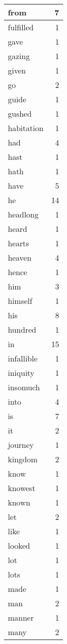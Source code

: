 \begin{center}
\begin{longtable}{l|r}
from & 7 \\ \hline
fulfilled & 1 \\ \hline
gave & 1 \\ \hline
gazing & 1 \\ \hline
given & 1 \\ \hline
go & 2 \\ \hline
guide & 1 \\ \hline
gushed & 1 \\ \hline
habitation & 1 \\ \hline
had & 4 \\ \hline
hast & 1 \\ \hline
hath & 1 \\ \hline
have & 5 \\ \hline
he & 14 \\ \hline
headlong & 1 \\ \hline
heard & 1 \\ \hline
hearts & 1 \\ \hline
heaven & 4 \\ \hline
hence & 1 \\ \hline
him & 3 \\ \hline
himself & 1 \\ \hline
his & 8 \\ \hline
hundred & 1 \\ \hline
in & 15 \\ \hline
infallible & 1 \\ \hline
iniquity & 1 \\ \hline
insomuch & 1 \\ \hline
into & 4 \\ \hline
is & 7 \\ \hline
it & 2 \\ \hline
journey & 1 \\ \hline
kingdom & 2 \\ \hline
know & 1 \\ \hline
knowest & 1 \\ \hline
known & 1 \\ \hline
let & 2 \\ \hline
like & 1 \\ \hline
looked & 1 \\ \hline
lot & 1 \\ \hline
lots & 1 \\ \hline
made & 1 \\ \hline
man & 2 \\ \hline
manner & 1 \\ \hline
many & 2 \\ \hline

\end{longtable}
\end{center}
